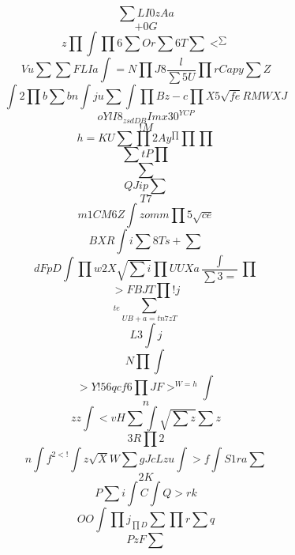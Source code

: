 \documentclass[12pt]{article}
\begin{document}
        \begin{minipage}[t][0pt]{\linewidth}

        \[\sum L I 0 z A a\]
\[+0G\]
\[z\prod\int\prod 6\sum O r\sum 6 T\sum <^{\sum}\]
\[V {u}\sum\sum F L I a\int = N\prod J 8\frac{l}{\sum 5 U}\prod r C a p y\sum Z\]
\[\int 2\prod b\sum b n\int j u\sum\int\prod B z - c\prod X 5\sqrt{fe} R M W X J\]
\[oYlI8_{zsdDB} I m x 3 0^{YCP}\]
\[!M\]
\[ h = K U\sum\prod 2 A y^{\prod}\prod\prod\]
\[\sum t P\prod\]
\[\sum\]
\[ Q J i p\sum\]
\[T7\]
\[m1CM6Z\int z {omm}\prod 5\sqrt{ce}\]
\[BXR\int i\sum 8 T s +\sum\]
\[dFpD\int\prod w 2 X\sqrt{\sum i}\prod U U X a\frac{\int}{\sum 3 =}\prod\]
\[> F B J T\prod ! j\]
\[_{te}\sum_{UB+a=tn7zT}\]
\[L3\int j\]
\[N\prod\int\]
\[>Y!56qcf6\prod J F >^{W=h}\int\]
\[n\]
\[zz\int < v H\sum\int\sqrt{\sum z}\sum z\]
\[3R\prod 2\]
\[n\int f^{2<!}\int z\sqrt{ X} W\sum g J c L z u\int > f\int S 1 r a\sum\]
\[2K\]
\[P\sum i\int C\int Q > r k\]
\[OO\int\prod j_{\prod D}\sum\prod r\sum q\]
\[PzF\sum
        \]
\end{minipage}
\end{document}
